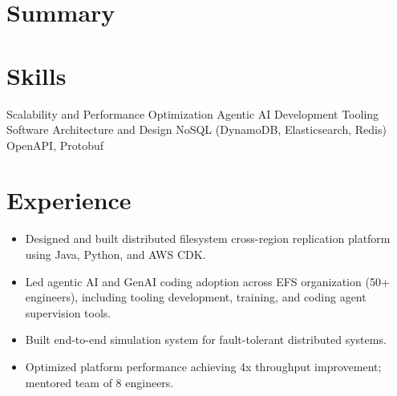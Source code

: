 \documentclass[11pt,a4paper,sans]{moderncv}
\begin{document}
\maketitle

\section{\textbf{Summary}}



\section{\textbf{Skills}}


                       {Scalability and Performance Optimization}
                       {Agentic AI Development Tooling}
                       {Software Architecture and Design}
                       {NoSQL (DynamoDB, Elasticsearch, Redis)}
                       {OpenAPI, Protobuf}





\section{\textbf{Experience}}

{ \begin{itemize} \itemsep -2pt
  \item Designed and built distributed filesystem cross-region replication platform using Java, Python, and AWS CDK.
  \item Led agentic AI and GenAI coding adoption across EFS organization (50+ engineers), including tooling development, training, and coding agent supervision tools.
  \item Built end-to-end simulation system for fault-tolerant distributed systems.
  \item Optimized platform performance achieving 4x throughput improvement; mentored team of 8 engineers.
 \end{itemize} }
\end{document}
